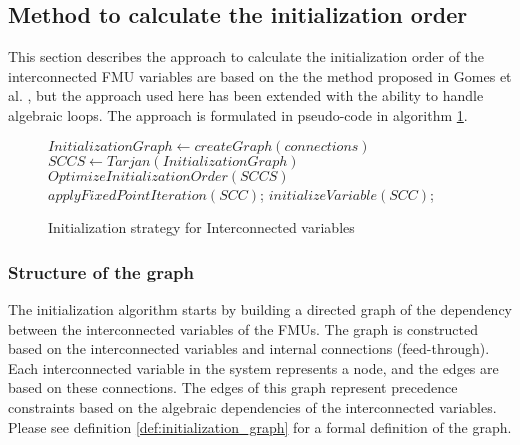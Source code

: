 \subsection{Method to calculate the initialization order}
This section describes the approach to calculate the initialization order of the interconnected FMU variables are based on the the method proposed in Gomes et al. \cite{Gomes2019b, BromanCompositionCo-Simulation}, but the approach used here has been extended with the ability to handle algebraic loops. The approach is formulated in pseudo-code in algorithm \ref{alg:initialization}.
\begin{figure}[htb]
  \centering
    \begin{algorithm}[H]
    \caption{Initialization strategy for Interconnected variables}
    \label{alg:initialization}
      \begin{algorithmic}[1]
        \State $InitializationGraph \gets createGraph(connections)$
        \State $SCCS \gets Tarjan(InitializationGraph)$
        \State $OptimizeInitializationOrder(SCCS)$
                \State $applyFixedPointIteration(SCC)$;
            \Else
                \State $initializeVariable(SCC)$;
            \EndIf
        \EndFor
        \end{algorithmic}
    \end{algorithm}
\end{figure}

\subsubsection{Structure of the graph}
The initialization algorithm starts by building a directed graph of the dependency between the interconnected variables of the FMUs. The graph is constructed based on the interconnected variables and internal connections (feed-through). Each interconnected variable in the system represents a node, and the edges are based on these connections. The edges of this graph represent precedence constraints based on the algebraic dependencies of the interconnected variables. Please see definition \ref{def:initialization_graph} for a formal definition of the graph.

